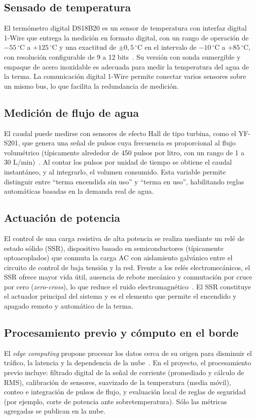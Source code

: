 \documentclass[11pt,a4paper]{article}
\begin{document}
\subsection{Sensado de temperatura}
El termómetro digital DS18B20 es un sensor de temperatura con interfaz digital 1-Wire que entrega la medición en formato digital, con un rango de operación de $-55\,^{\circ}\mathrm{C}$ a $+125\,^{\circ}\mathrm{C}$ y una exactitud de $\pm 0{,}5\,^{\circ}\mathrm{C}$ en el intervalo de $-10\,^{\circ}\mathrm{C}$ a $+85\,^{\circ}\mathrm{C}$, con resolución configurable de 9 a 12 bits~\cite{ds18b20}. Su versión con sonda sumergible y empaque de acero inoxidable es adecuada para medir la temperatura del agua de la terma. La comunicación digital 1-Wire permite conectar varios sensores sobre un mismo bus, lo que facilita la redundancia de medición.

\subsection{Medición de flujo de agua}
El caudal puede medirse con sensores de efecto Hall de tipo turbina, como el YF-S201, que genera una señal de pulsos cuya frecuencia es proporcional al flujo volumétrico (típicamente alrededor de 450 pulsos por litro, con un rango de 1 a 30 L/min)~\cite{yfs201201}. Al contar los pulsos por unidad de tiempo se obtiene el caudal instantáneo, y al integrarlo, el volumen consumido. Esta variable permite distinguir entre ``terma encendida sin uso'' y ``terma en uso'', habilitando reglas automáticas basadas en la demanda real de agua.

\subsection{Actuación de potencia}
El control de una carga resistiva de alta potencia se realiza mediante un relé de estado sólido (SSR), dispositivo basado en semiconductores (típicamente optoacoplados) que conmuta la carga AC con aislamiento galvánico entre el circuito de control de baja tensión y la red. Frente a los relés electromecánicos, el SSR ofrece mayor vida útil, ausencia de rebote mecánico y conmutación por cruce por cero (\emph{zero-cross}), lo que reduce el ruido electromagnético~\cite{ssr}. El SSR constituye el actuador principal del sistema y es el elemento que permite el encendido y apagado remoto y automático de la terma.

\subsection{Procesamiento previo y cómputo en el borde}
El \emph{edge computing} propone procesar los datos cerca de su origen para disminuir el tráfico, la latencia y la dependencia de la nube~\cite{shi2016}. En el proyecto, el procesamiento previo incluye: filtrado digital de la señal de corriente (promediado y cálculo de RMS), calibración de sensores, suavizado de la temperatura (media móvil), conteo e integración de pulsos de flujo, y evaluación local de reglas de seguridad (por ejemplo, corte de potencia ante sobretemperatura). Sólo las métricas agregadas se publican en la nube.
\end{document}
